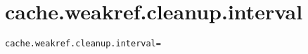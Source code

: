 \section{cache.weakref.cleanup.interval}
\label{configuration:CacheWeakrefCleanupInterval}
\AvailableInCsharpOnly{\TODO}
\begin{lstlisting}[style=Props,caption={Usage example for \textit{cache.weakref.cleanup.interval}}]
cache.weakref.cleanup.interval=
\end{lstlisting}